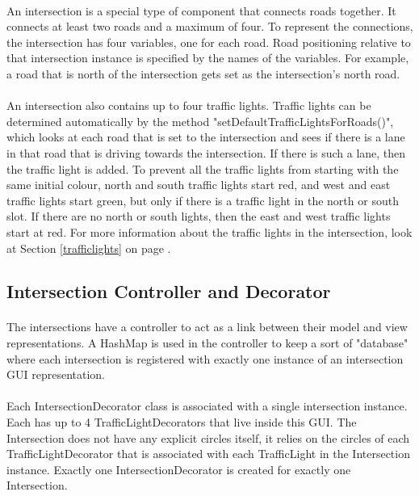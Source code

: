 \documentclass[a4paper,11pt,titlepage]{article}
\begin{document}
\paragraph{}
An intersection is a special type of component that connects roads together. It connects at least two roads and a maximum of four. To represent the connections, the intersection has four variables, one for each road. Road positioning relative to that intersection instance is specified by the names of the variables. For example, a road that is north of the intersection gets set as the intersection's north road.
\paragraph{}
An intersection also contains up to four traffic lights. Traffic lights can be determined automatically by the method "setDefaultTrafficLightsForRoads()", which looks at each road that is set to the intersection and sees if there is a lane in that road that is driving towards the intersection. If there is such a lane, then the traffic light is added. To prevent all the traffic lights from starting with the same initial colour, north and south traffic lights start red, and west and east traffic lights start green, but only if there is a traffic light in the north or south slot. If there are no north or south lights, then the east and west traffic lights start at red. For more information about the traffic lights in the intersection, look at Section \ref{trafficlights} on page \pageref{trafficlights}.
\subsection{Intersection Controller and Decorator}
\paragraph{}
The intersections have a controller to act as a link between their model and view representations. A HashMap is used in the controller to keep a sort of "database" where each intersection is registered with exactly one instance of an intersection GUI representation.
\paragraph{}
Each IntersectionDecorator class is associated with a single intersection instance. Each has up to 4 TrafficLightDecorators that live inside this GUI. The Intersection does not have any explicit circles itself, it relies on the circles of each TrafficLightDecorator that is associated with each TrafficLight in the Intersection instance. Exactly one IntersectionDecorator is created for exactly one Intersection.
\end{document}
